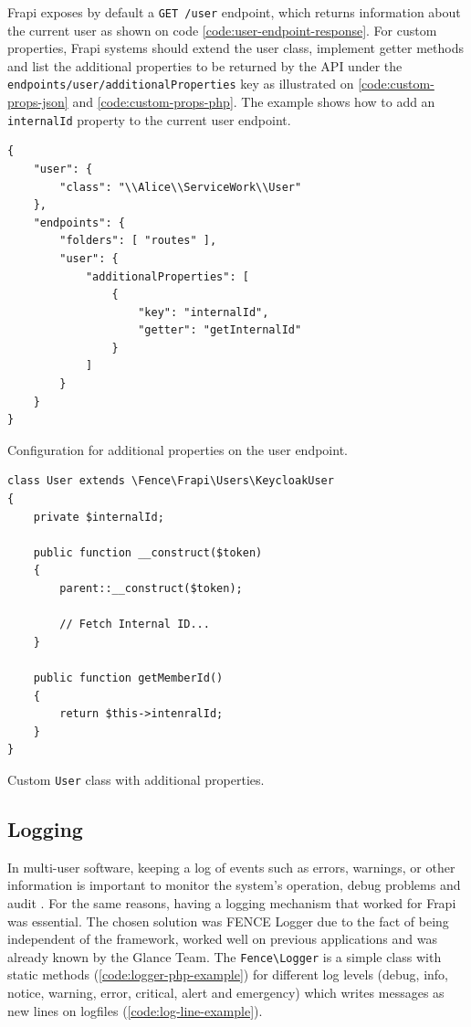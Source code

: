 Frapi exposes by default a \texttt{GET /user} endpoint, which returns information about the current user as shown on code \autoref{code:user-endpoint-response}. For custom properties, Frapi systems should extend the user class, implement getter methods and list the additional properties to be returned by the API under the \texttt{endpoints/user/additionalProperties} key as illustrated on \autoref{code:custom-props-json} and \autoref{code:custom-props-php}. The example shows how to add an \texttt{internalId} property to the current user endpoint.

\begin{listing}[htbp]
\begin{verbatim}
{
    "user": {
        "class": "\\Alice\\ServiceWork\\User"
    },
    "endpoints": {
        "folders": [ "routes" ],
        "user": {
            "additionalProperties": [
                {
                    "key": "internalId",
                    "getter": "getInternalId"
                }
            ]
        }
    }
}
\end{verbatim}
\caption{Configuration for additional properties on the user endpoint.}
\label{code:custom-props-json}
\end{listing}

\begin{listing}[htbp]
\begin{verbatim}
class User extends \Fence\Frapi\Users\KeycloakUser
{
	private $internalId;

	public function __construct($token)
	{
		parent::__construct($token);
		
		// Fetch Internal ID...
	}

    public function getMemberId()
    {
        return $this->intenralId;
    }
}
\end{verbatim}
\caption{Custom \texttt{User} class with additional properties.}
\label{code:custom-props-php}
\end{listing}

\subsection{Logging}

In multi-user software, keeping a log of events such as errors, warnings, or other information is important to monitor the system's operation, debug problems and audit \cite{logging-wikipedia}. For the same reasons, having a logging mechanism that worked for Frapi was essential. The chosen solution was FENCE Logger due to the fact of being independent of the framework, worked well on previous applications and was already known by the Glance Team. The \texttt{Fence\textbackslash Logger} is a simple class with static methods (\autoref{code:logger-php-example}) for different log levels (debug, info, notice, warning, error, critical, alert and emergency) which writes messages as new lines on logfiles (\autoref{code:log-line-example}).

